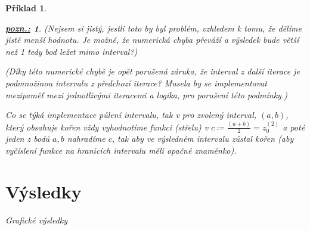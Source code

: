\documentclass{article}
\newtheorem{example}{Příklad}
\newtheorem*{remark}{\underline{\it pozn.:}}
\begin{document}
\begin{example}
\begin{remark}
		(Nejsem si jistý, jestli toto by byl problém, vzhledem k tomu, že dělíme jistě menší hodnotu. Je možné, že numerická chyba převáží a výsledek bude větší než 1 tedy bod ležet mimo interval?)

		(Díky této numerické chybě je opět porušená záruka, že interval z další iterace je podmnožinou intervalu z předchozí iterace? Musela by se implementovat mezipaměť mezi jednotlivými iteracemi a logika, pro porušení této podmínky.)
	\end{remark}

	Co se týká implementace půlení intervalu, tak v pro zvolený interval, $(a,b)$, který obsahuje kořen vždy vyhodnotíme funkci (střelu) v $ c \coloneqq \frac{(a+b)}{2} = z^{(2)}_{0}$ a poté jeden z bodů $a,b$ nahradíme $c$, tak aby ve výsledném intervalu zůstal kořen (aby vyčíslení funkce na hranicích intervalu měli opačné znaménko).\pagebreak

	\section*{Výsledky}
	Grafické výsledky

	\center
	

\end{example}
\end{document}
